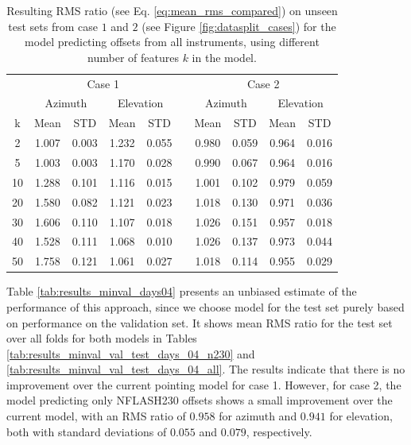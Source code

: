 \begin{table}[!htbp]
    \centering
    \caption{%
    Resulting RMS ratio (see Eq. \eqref{eq:mean_rms_compared}) on unseen test sets from case $1$ and $2$ (see Figure \ref{fig:datasplit_cases}) for the model predicting offsets from all instruments,
    using different number of features $k$ in the model.}
    \begin{tabular}{ccccc c cccc}
        \toprule
        \multicolumn{1}{c}{} & \multicolumn{4}{c}{Case 1} & & \multicolumn{4}{c}{Case 2} \\
        \cmidrule(lr){2-5} \cmidrule(lr){7-10}
        \multicolumn{1}{c}{} & \multicolumn{2}{c}{Azimuth} & \multicolumn{2}{c}{Elevation} & & \multicolumn{2}{c}{Azimuth} & \multicolumn{2}{c}{Elevation} \\ 
        \cmidrule(lr){2-5} \cmidrule(lr){7-10}
        k & Mean & STD & Mean & STD & & Mean & STD & Mean & STD \\ 
        \midrule
         2 &     1.007 &     0.003 &     1.232 &     0.055 &  &  0.980 &     0.059 &     0.964 &     0.016 \\
         5 &     1.003 &     0.003 &     1.170 &     0.028 &  &  0.990 &     0.067 &     0.964 &     0.016 \\
        10 &     1.288 &     0.101 &     1.116 &     0.015 &  &  1.001 &     0.102 &     0.979 &     0.059 \\
        20 &     1.580 &     0.082 &     1.121 &     0.023 &  &  1.018 &     0.130 &     0.971 &     0.036 \\
        30 &     1.606 &     0.110 &     1.107 &     0.018 &  &  1.026 &     0.151 &     0.957 &     0.018 \\
        40 &     1.528 &     0.111 &     1.068 &     0.010 &  &  1.026 &     0.137 &     0.973 &     0.044 \\
        50 &     1.758 &     0.121 &     1.061 &     0.027 &  &  1.018 &     0.114 &     0.955 &     0.029 \\
        \bottomrule
    \end{tabular}
    \label{tab:results_all_days}
\end{table}

\newpage

Table \ref{tab:results_minval_days04} presents an unbiased estimate of the performance of this approach,
since we choose model for the test set purely based on performance on the validation set.
It shows mean RMS ratio for the test set over all folds for both models in Tables \ref{tab:results_minval_val_test_days_04_n230} and \ref{tab:results_minval_val_test_days_04_all}.
The results indicate that there is no improvement over the current pointing model for case 1.
However, for case 2, the model predicting only NFLASH230 offsets shows a small improvement over the current model,
with an RMS ratio of $0.958$ for azimuth and $0.941$ for elevation, both with standard deviations of $0.055$ and $0.079$, respectively.\\

